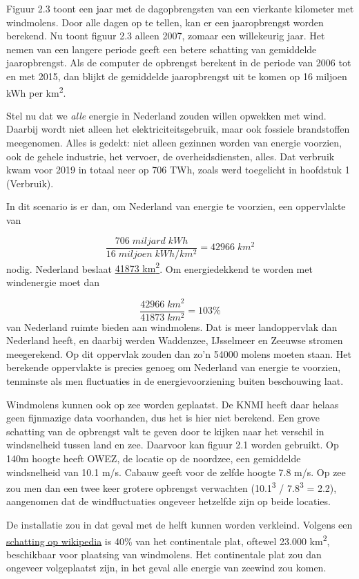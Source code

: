 \documentclass[
  11pt,
  a4paper,
]{book}
\begin{document}
Figuur 2.3 toont een jaar met de dagopbrengsten van een vierkante kilometer met windmolens. Door alle dagen op te tellen, kan er een
jaaropbrengst worden berekend. Nu toont figuur 2.3 alleen 2007, zomaar een willekeurig jaar. Het nemen van een langere periode geeft een betere
schatting van gemiddelde jaaropbrengst. Als de computer de opbrengst berekent in de periode van 2006 tot en met 2015, dan blijkt de
gemiddelde jaaropbrengst uit te komen op 16 miljoen kWh per km\textsuperscript{2}.

Stel nu dat we \emph{alle} energie in Nederland zouden willen opwekken met wind. Daarbij wordt niet alleen het elektriciteitsgebruik, maar ook
fossiele brandstoffen meegenomen. Alles is gedekt: niet alleen gezinnen worden van energie voorzien, ook de gehele industrie, het vervoer, de
overheidsdiensten, alles. Dat verbruik kwam voor 2019 in totaal neer op 706 TWh, zoals werd toegelicht in hoofdstuk 1
(Verbruik).

In dit scenario is er dan, om Nederland van energie te voorzien, een oppervlakte van

\[ \frac {706 \; miljard\; kWh} {16 \;miljoen\;kWh / km^2} = 42966 \; km^2\]
\noindent nodig. Nederland beslaat \href{https://nl.wikipedia.org/wiki/Nederland}{41873 km\textsuperscript{2}}. Om energiedekkend te
worden met windenergie moet dan

\[ \frac {42966 \; km^2} {41873 \; km^2} = 103 \%\]
\noindent van Nederland ruimte bieden aan windmolens. Dat is meer landoppervlak dan Nederland heeft, en daarbij werden Waddenzee,
IJsselmeer en Zeeuwse stromen meegerekend. Op dit oppervlak zouden dan zo'n 54000
molens moeten staan. Het berekende oppervlakte is precies genoeg om Nederland van energie te voorzien, tenminste als men fluctuaties in de
energievoorziening buiten beschouwing laat.

Windmolens kunnen ook op zee worden geplaatst. De KNMI heeft daar helaas geen fijnmazige data voorhanden, dus het is hier niet
berekend. Een grove schatting van de opbrengst valt te geven door te kijken naar het verschil in windsnelheid tussen land en zee. Daarvoor
kan figuur 2.1 worden gebruikt. Op 140m hoogte heeft OWEZ, de locatie op de noordzee, een gemiddelde windsnelheid van
10.1 m/s. Cabauw geeft voor de zelfde hoogte
7.8 m/s. Op zee zou men dan een twee keer grotere opbrengst verwachten (10.1\textsuperscript{3} /
7.8\textsuperscript{3} =
2.2), aangenomen dat de windfluctuaties ongeveer
hetzelfde zijn op beide locaties.

De installatie zou in dat geval met de helft kunnen worden verkleind. Volgens een \href{https://nl.wikipedia.org/wiki/Windturbines_in_Nederland}{schatting op
wikipedia} is 40\% van het continentale plat, oftewel 23.000 km\textsuperscript{2}, beschikbaar voor
plaatsing van windmolens. Het continentale plat zou dan ongeveer volgeplaatst zijn, in het geval alle energie van zeewind zou komen.
\end{document}
